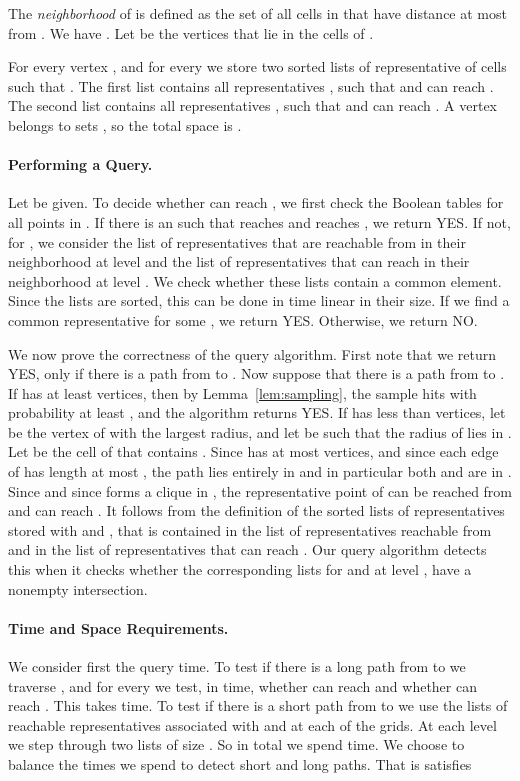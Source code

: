 \documentclass[11pt,a4paper]{paper}
\begin{document}
The \emph{neighborhood}  of  is defined
as the set of all cells in  that have distance at most
 from . We have
.
Let  be the vertices
that lie in the cells of .

For every vertex , and
for every  we store two sorted lists of representative of cells
 such that . The first list
contains all  representatives , such that   and  can reach  .
The second list contains all
 representatives ,  such that   and    can reach .
A vertex  belongs to 
sets , so the total space is
.

\paragraph*{Performing a Query.}
Let  be given. To decide whether  can reach ,
we first check the Boolean tables for all  points
in . If there
is an  such that  reaches
 and  reaches , we return YES. If not,
for ,
we consider the list of representatives
that are reachable from  in their neighborhood at level  and
the list of representatives that can reach  in their
neighborhood at level . We check
whether these lists contain a common element. Since the lists are
sorted, this can be done in time linear in their size.
If we find a common representative for some , we return YES.
Otherwise, we return NO.

We now prove the correctness of the query algorithm. First note that we
return YES, only if there is a path from  to
.  Now suppose that there is a path  from  to .
If  has at least  vertices,
then by Lemma~\ref{lem:sampling}, the sample  hits 
with probability at least , and the algorithm returns YES.
If  has less than  vertices, let  be the
vertex of  with the largest radius,
and let  be such that the radius of  lies in .
Let  be the cell of  that contains .
Since  has at most  vertices, and since each edge
of  has length at most , the path  lies
entirely in   and in particular
 both  and  are in
. Since  and since
 forms a clique in , the representative point
 of  can be reached from  and can reach .
It follows from the definition of the sorted lists of representatives stored with  and , that
  is
contained in the list of representatives  reachable  from  and in the
list of representatives that can reach .
Our query algorithm detects this when it checks
whether the corresponding
lists for  and  at level , have a nonempty intersection.

\paragraph*{Time and Space Requirements.}
We consider first the query time. To test if there is a long path from
 to  we traverse , and for every  we test,
 in  time, whether
 can reach  and whether  can reach .
This takes  time.
To test if there is a short path from  to  we use
the lists of reachable representatives associated with  and  at each of the  grids.
At each level
we step through two lists of size . So
in total we spend  time.
We choose  to balance the times we spend to detect short and long paths.
That is  satisfies
\end{document}
